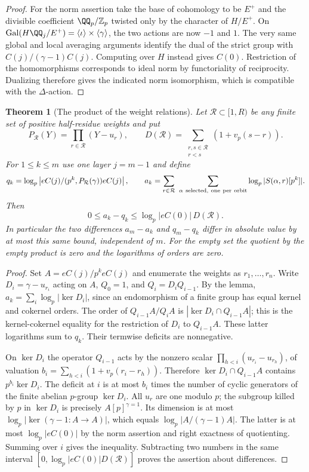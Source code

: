 \documentclass[a4paper,11pt]{article}
\newtheorem{theorem}[proposition]{Theorem}
\theoremstyle{definition}
\theoremstyle{remark}
\newcommand{\ZZ}{\mathbb Z}\newcommand{\ord}{\operatorname{ord}}
\numberwithin{equation}{section}
\begin{document}
\begin{proof}
For the norm assertion take the base of cohomology to be
\(E^+\) and the divisible coefficient \(\QQ_p/\ZZ_p\) twisted
only by the character of \(H/E^+\). On
\(\operatorname{Gal}(H\QQ_j/E^+)=
\langle\iota\rangle\times\langle\gamma\rangle\), the two
actions are now \(-1\) and \(1\). The very same global and
local averaging arguments identify the dual of the strict
group with \(C(j)/(\gamma-1)C(j)\). Computing over \(H\)
instead gives \(C(0)\). Restriction of the homomorphisms
corresponds to ideal norm by functoriality of reciprocity.
Dualizing therefore gives the indicated norm isomorphism,
which is compatible with the \(\Delta\)-action.
\end{proof}

\begin{theorem}[The product of the weight relations]
\leavevmode\label{thm:productmeasure647}
Let \(\mathcal R\subset[1,R)\) be any finite set of positive
half-residue weights and put
\[
 P_{\mathcal R}(Y)=\prod_{r\in\mathcal R}(Y-u_r),\qquad
 D(\mathcal R)=\sum_{\substack{r,s\in\mathcal R\\r<s}}
                                      (1+v_p(s-r)).
\]
For \(1\le k\le m\) use one layer \(j=m-1\) and define
\[
 q_k=\log_p\left|eC(j)/(p^k,P_{\mathcal R}(\gamma))eC(j)\right|,
 \qquad
 a_k=\sum_{r\in\mathcal R}\ 
       \sum_{\alpha\ {\rm selected,\ one\ per\ orbit}}
                        \log_p |S(\alpha,r)[p^k]|.
\]
Then
\[
          0\le a_k-q_k\le \log_p|eC(0)|\,D(\mathcal R).
\]
In particular the two differences \(a_m-a_k\) and
\(q_m-q_k\) differ in absolute value by at most this same
bound, independent of \(m\). For the empty set the quotient
by the empty product is zero and the logarithms of orders
are zero.
\end{theorem}
\begin{proof}
Set \(A=eC(j)/p^k eC(j)\) and enumerate the weights as
\(r_1,\ldots,r_n\). Write \(D_i=\gamma-u_{r_i}\) acting
on \(A\), \(Q_0=1\), and \(Q_i=D_iQ_{i-1}\).
By the lemma, \(a_k=\sum_i\log_p|\ker D_i|\), since an
endomorphism of a finite group has equal kernel and cokernel
orders. The order of \(Q_{i-1}A/Q_i A\) is
\(|\ker D_i\cap Q_{i-1}A|\); this is the kernel-cokernel
equality for the restriction of \(D_i\) to \(Q_{i-1}A\).
These latter logarithms sum to \(q_k\). Their termwise
deficits are nonnegative.

On \(\ker D_i\) the operator \(Q_{i-1}\) acts by the
nonzero scalar \(\prod_{h<i}(u_{r_i}-u_{r_h})\), of
valuation \(b_i=\sum_{h<i}(1+v_p(r_i-r_h))\). Therefore
\(\ker D_i\cap Q_{i-1}A\) contains \(p^{b_i}\ker D_i\).
The deficit at \(i\) is at most \(b_i\) times the number
of cyclic generators of the finite abelian \(p\)-group
\(\ker D_i\). All \(u_r\) are one modulo \(p\); the subgroup
killed by \(p\) in \(\ker D_i\) is precisely
\(A[p]^{\gamma=1}\). Its dimension is at most
\(\log_p|\ker(\gamma-1:A\to A)|\), which equals
\(\log_p|A/(\gamma-1)A|\). The latter is at most
\(\log_p|eC(0)|\) by the norm assertion and right exactness
of quotienting. Summing over \(i\) gives the inequality.
Subtracting two numbers in the same interval
\([0,\log_p|eC(0)|D(\mathcal R)]\) proves the assertion
about differences.
\end{proof}
\end{document}
